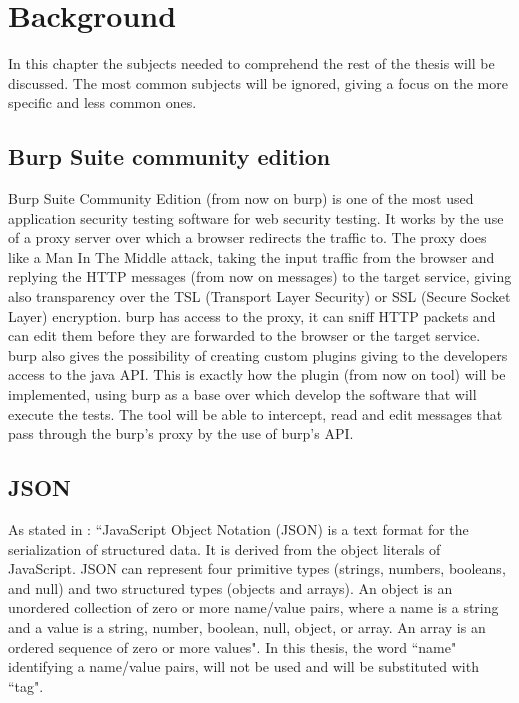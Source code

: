 \chapter{Background}
\label{chap:Background}
In this chapter the subjects needed to comprehend the rest of the thesis will be discussed. The most common subjects will be ignored, giving a focus on the more specific and less common ones.

\section{Burp Suite community edition}
Burp Suite Community Edition (from now on \Gls{burp}) is one of the most used application security testing software for web security testing. It works by the use of a proxy server over which a browser redirects the traffic to. The proxy does like a Man In The Middle attack, taking the input traffic from the browser and replying the HTTP messages (from now on messages) to the target service, giving also transparency over the TSL (Transport Layer Security) or SSL (Secure Socket Layer) encryption. \Gls{burp} has access to the proxy, it can sniff HTTP packets and can edit them before they are forwarded to the browser or the target service. \Gls{burp} also gives the possibility of creating custom plugins giving to the developers access to the java API. This is exactly how the plugin (from now on tool) will be implemented, using \Gls{burp} as a base over which develop the software that will execute the tests. The tool will be able to intercept, read and edit messages that pass through the \Gls{burp}'s proxy by the use of \Gls{burp}'s API.

\section{JSON}
As stated in \cite{json_standard}: ``JavaScript Object Notation (JSON) is a text format for the serialization of structured data.  It is derived from the object literals of JavaScript. JSON can represent four primitive types (strings, numbers, booleans, and null) and two structured types (objects and arrays). An object is an unordered collection of zero or more name/value pairs, where a name is a string and a value is a string, number, boolean, null, object, or array. An array is an ordered sequence of zero or more values".
In this thesis, the word ``name" identifying a name/value pairs, will not be used and will be substituted with ``tag".

